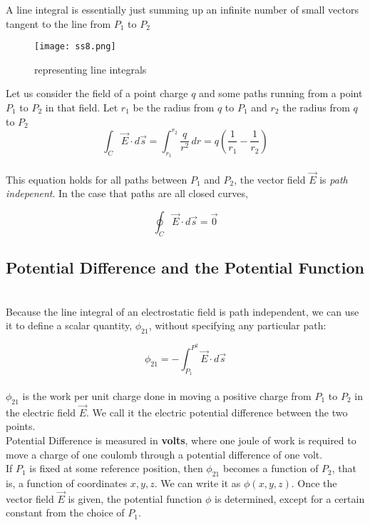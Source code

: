 \documentclass[svgnames]{article}
\begin{document}
A line integral is essentially just summing up an infinite number of small
vectors tangent to the line from $P_1$ to $P_2$ \\ 

\begin{figure}[!hb]
  \centering
  \texttt{[image: ss8.png]}
  \caption{representing line integrals}
\end{figure}

Let us consider the field of a point charge $q$ and some paths running from
a point $P_1$ to $P_2$ in that field. Let $r_1$ be the radius from $q$ to $P_1$
and $r_2$ the radius from $q$ to $P_2$ \\ 

\[ \int_C \vec{E} \cdot d\vec{s} = \int_{r_1}^{r_2} \frac{q}{r^2} \, dr
= q\left(\frac{1}{r_1} - \frac{1}{r_2} \right) \] \\

This equation holds for all paths between $P_1$ and $P_2$, the vector field
$\vec{E}$ is \textit{path indepenent}. In the case that paths are all closed
curves, \\

\begin{tcolorbox}
\[ \oint_C \vec{E} \cdot d\vec{s} = \vec{0} \] 
\end{tcolorbox}

\subsection{Potential Difference and the Potential Function} \mbox{} \\

Because the line integral of an electrostatic field is path independent, we can
use it to define a scalar quantity, $\phi_{21}$, without specifying any
particular path:

\[ \phi_{21} = -\int_{P_1}^{P^2} \vec{E} \cdot d\vec{s} \] \\

$\phi_{21}$ is the work per unit charge done in moving a positive charge from
$P_1$ to $P_2$ in the electric field $\vec{E}$. We call it the electric
potential difference between the two points. \\
Potential Difference is measured in \textbf{volts}, where one joule of work is
required to move a charge of one coulomb through a potential difference of one
volt. \\
If $P_1$ is fixed at some reference position, then $\phi_{21}$ becomes
a function of $P_2$, that is, a function of coordinates $x, y, z$. We can write
it as $\phi(x, y, z)$. Once the vector field $\vec{E}$ is given, the potential
function $\phi$ is determined, except for a certain constant from the choice of
$P_1$. \\ \\
\end{document}
